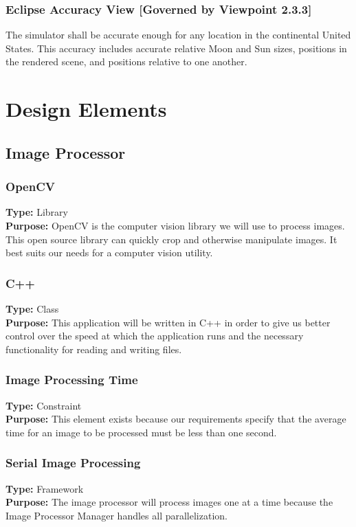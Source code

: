 \documentclass[10pt, onecolumn, draftclsnofoot, letterpaper, compsoc]{IEEEtran}
\begin{document}
  \subsubsection{Eclipse Accuracy View [Governed by Viewpoint 2.3.3]}
  The simulator shall be accurate enough for any location in
  the continental United States. This accuracy includes
  accurate relative Moon and Sun sizes, positions in the
  rendered scene, and positions relative to one another. \\

\section{Design Elements}

\subsection{Image Processor}

\subsubsection{OpenCV}
\textbf{Type:} Library\\
\textbf{Purpose:} OpenCV is the computer vision library we will use to process
images. This open source library can quickly crop and otherwise manipulate
images. It best suits our needs for a computer vision utility.\\

\subsubsection{C++}
\textbf{Type:} Class\\
\textbf{Purpose:} This application will be written in C++ in order to give us
better control over the speed at which the application runs and the necessary
functionality for reading and writing files. \\

\subsubsection{Image Processing Time}
\textbf{Type:} Constraint\\
\textbf{Purpose:} This element exists because our requirements specify that the
average time for an image to be processed must be less than one second.\\

\subsubsection{Serial Image Processing}
\textbf{Type:} Framework\\
\textbf{Purpose:} The image processor will process images one at a time because
the Image Processor Manager handles all parallelization.\\
\end{document}
